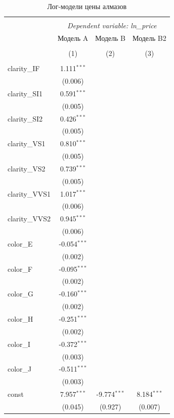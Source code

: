 \begin{table}[!htbp] \centering
  \caption{Лог-модели цены алмазов}
\begin{tabular}{@{\extracolsep{5pt}}lccc}
\\[-1.8ex]\hline
\hline \\[-1.8ex]
& \multicolumn{3}{c}{\textit{Dependent variable: ln_price}} \
\cr \cline{2-4}
\\[-1.8ex] & \multicolumn{1}{c}{Модель A} & \multicolumn{1}{c}{Модель B} & \multicolumn{1}{c}{Модель B2}  \\
\\[-1.8ex] & (1) & (2) & (3) \\
\hline \\[-1.8ex]
 clarity_IF & 1.111$^{***}$ & & \\
& (0.006) & & \\
 clarity_SI1 & 0.591$^{***}$ & & \\
& (0.005) & & \\
 clarity_SI2 & 0.426$^{***}$ & & \\
& (0.005) & & \\
 clarity_VS1 & 0.810$^{***}$ & & \\
& (0.005) & & \\
 clarity_VS2 & 0.739$^{***}$ & & \\
& (0.005) & & \\
 clarity_VVS1 & 1.017$^{***}$ & & \\
& (0.006) & & \\
 clarity_VVS2 & 0.945$^{***}$ & & \\
& (0.006) & & \\
 color_E & -0.054$^{***}$ & & \\
& (0.002) & & \\
 color_F & -0.095$^{***}$ & & \\
& (0.002) & & \\
 color_G & -0.160$^{***}$ & & \\
& (0.002) & & \\
 color_H & -0.251$^{***}$ & & \\
& (0.002) & & \\
 color_I & -0.372$^{***}$ & & \\
& (0.003) & & \\
 color_J & -0.511$^{***}$ & & \\
& (0.003) & & \\
 const & 7.957$^{***}$ & -9.774$^{***}$ & 8.184$^{***}$ \\
& (0.045) & (0.927) & (0.007) \\

\end{tabular}
\end{table}
